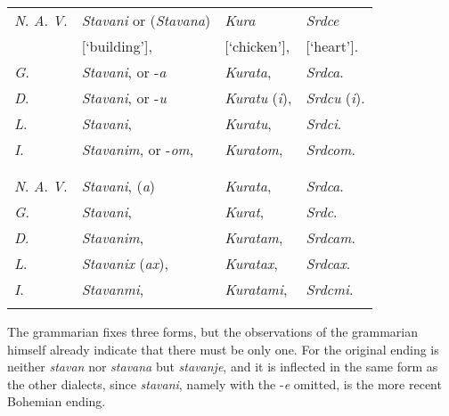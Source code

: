 \begin{longtable}{ l l l l }
    \lsptoprule
    \multicolumn{4}{ c }{Singular.} \\
    \midrule
    \textit{N}. \textit{A}. \textit{V}. & \textit{Stavani} or (\textit{Stavana}) & \textit{Kura} & \textit{Srdce} \\
    & [‘building’], & [‘chicken’], & [‘heart’]. \\
    \textit{G}. & \textit{Stavani}, or -\textit{a} & \textit{Kurata}, & \textit{Srdca}. \\
    \textit{D}. & \textit{Stavani}, or -\textit{u} & \textit{Kuratu} (\textit{i}), & \textit{Srdcu} (\textit{i}). \\ 
    \textit{L}. & \textit{Stavani}, & \textit{Kuratu}, & \textit{Srdci}. \\
    \textit{I}. & \textit{Stavanim}, or -\textit{om}, & \textit{Kuratom}, & \textit{Srdcom}. \\
    \lspbottomrule
    \\
    \lsptoprule
    \multicolumn{4}{ c }{Plural.} \\
    \midrule
    \textit{N}. \textit{A}. \textit{V}. & \textit{Stavani}, (\textit{a}) & \textit{Kurata}, & \textit{Srdca}. \\
    \textit{G}. & \textit{Stavani}, & \textit{Kurat}, & \textit{Srdc}. \\
    \textit{D}. & \textit{Stavanim}, & \textit{Kuratam}, & \textit{Srdcam}. \\
    \textit{L}. & \textit{Stavanix} (\textit{ax}), & \textit{Kuratax}, & \textit{Srdcax}. \\
    \textit{I}. & \textit{Stavanmi}, & \textit{Kuratami}, & \textit{Srdcmi}. \\
    \lspbottomrule
\end{longtable}

The grammarian fixes three forms, but the observations of the grammarian himself already indicate that there must be only one. For the original ending is neither \textit{stavan} nor \textit{stavana} but \textit{stavanje}, and it is inflected in the same form as the other dialects, since \textit{stavani}, namely with the -\textit{e} omitted, is the more recent Bohemian ending.

